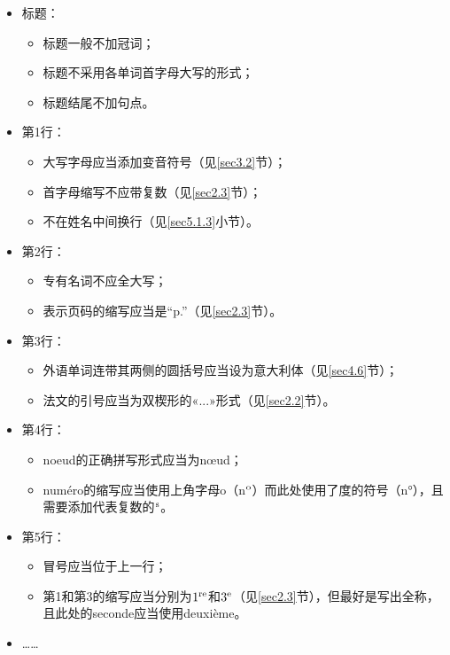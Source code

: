 \begin{itemize}
    \item 标题：
    \begin{itemize}
        \item 标题一般不加冠词；
        \item 标题不采用各单词首字母大写的形式；
        \item 标题结尾不加句点。
    \end{itemize} 
    \item 第1行：
    \begin{itemize}
        \item 大写字母应当添加变音符号（见\ref{sec3.2}节）；
        \item 首字母缩写不应带复数（见\ref{sec2.3}节）；
        \item 不在姓名中间换行（见\ref{sec5.1.3}小节）。
    \end{itemize}
    \item 第2行：
    \begin{itemize}
        \item 专有名词不应全大写；
        \item 表示页码的缩写应当是``p.''（见\ref{sec2.3}节）。
    \end{itemize}
    \item 第3行：
    \begin{itemize}
        \item 外语单词连带其两侧的圆括号应当设为意大利体（见\ref{sec4.6}节）；
        \item 法文的引号应当为双楔形的«...»形式（见\ref{sec2.2}节）。
    \end{itemize}
    \item 第4行：
    \begin{itemize}
        \item noeud的正确拼写形式应当为nœud；
        \item numéro的缩写应当使用上角字母o（n$^{\rm o}$）而此处使用了度的符号（n°），且需要添加代表复数的$^{\rm s}$。
    \end{itemize}
    \item 第5行：
    \begin{itemize}
        \item 冒号应当位于上一行；
        \item 第1和第3的缩写应当分别为$1^{\rm re}$和$3^{\rm e}$（见\ref{sec2.3}节），但最好是写出全称，且此处的seconde应当使用deuxième。
    \end{itemize}
    \item ……
\end{itemize}

